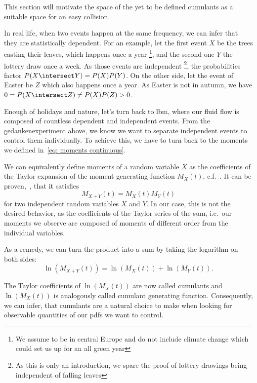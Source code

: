 
This section will motivate the space of the yet to be defined cumulants as a suitable space for an easy collision.

In real life, when two events happen at the same frequency, we can infer that they are statistically dependent.
For an example, let the first event $X$ be the trees casting their leaves, which happens once a year
\footnote{We assume to be in central Europe and do not include climate change which could set us up for an all green year},
and the second one $Y$ the lottery draw once a week.
As those events are independent
\footnote{As this is only an introduction, we spare the proof of lottery drawings being independent of falling leaves},
the probabilities factor $P(X\intersect Y) = P(X)P(Y)$.
On the other side, let the event of Easter be $Z$ which also happens once a year.
As Easter is not in autumn, we have $0 = P(X\intersect Z) \neq P(X)P(Z) > 0$.

Enough of holidays and nature, let's turn back to \gls{lbm}, where our fluid flow is composed of countless dependent and independent events.
From the gedankenexperiment above, we know we want to separate independent events to control them individually.
To achieve this, we have to turn back to the moments we defined in~\eqref{eq: moments continuous}.

We can equivalently define moments of a random variable $X$ as the coefficients of the Taylor expansion of the moment generating function $M_X(t)$, c.f.~\cite{weissteinMGF}.
It can be proven,~\cite{weissteinMGF}, that it satisfies
\begin{equation}
\label{eq: moment generating function for independent variables}
  M_{X+Y}(t) = M_{X}(t)M_{Y}(t)
\end{equation}
for two independent random variables $X$ and $Y$.
In our case, this is not the desired behavior, as the coefficients of the Taylor series of the sum, i.e.\ our moments we observe are composed of moments of different order from the individual variables.

As a remedy, we can turn the product into a sum by taking the logarithm on both sides:
\begin{equation}
  \label{eq: cumulant generating function for independent variables}
  \ln(M_{X+Y}(t)) = \ln(M_{X}(t)) + \ln(M_{Y}(t)).
\end{equation}

The Taylor coefficients of $\ln(M_X(t))$ are now called cumulants and $\ln(M_{X}(t))$ is analogously called cumulant generating function.
Consequently, we can infer, that cumulants are a natural choice to make when looking for observable quantities of our \glspl{pdf} we want to control.

